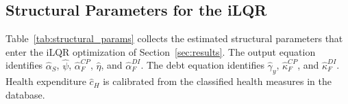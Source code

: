 \documentclass[12pt, a4paper]{article}
\begin{document}

\subsection{Structural Parameters for the iLQR}
\label{subsec:parameters_ilqr}

Table~\ref{tab:structural_params} collects the estimated structural parameters that enter the iLQR optimization of Section~\ref{sec:results}. The output equation identifies $\hat{\alpha}_S$, $\hat{\psi}$, $\hat{\alpha}_F^{CP}$, $\hat{\eta}$, and $\hat{\alpha}_F^{DI}$. The debt equation identifies $\hat{\gamma}_y$, $\hat{\kappa}_F^{CP}$, and $\hat{\kappa}_F^{DI}$. Health expenditure $\hat{c}_H$ is calibrated from the classified health measures in the database.
\end{document}
